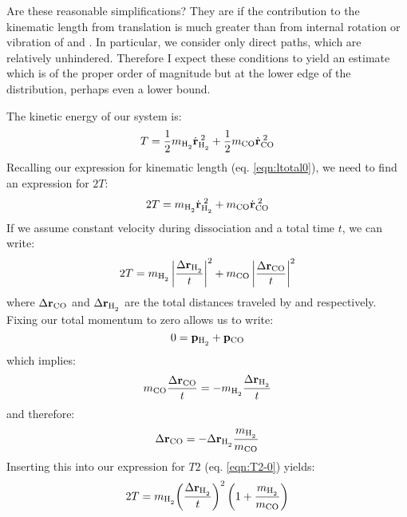 \documentclass[letterpaper,12pt]{article}
\renewcommand{\vec}[1]{\mathbf{#1}}
\renewcommand{\refeq}[1]{eq. \ref{eqn:#1}}
\begin{document}
Are these reasonable simplifications? They are if the contribution to the kinematic length from translation is much greater than from internal rotation or vibration of  and . In particular, we consider only direct paths, which are relatively unhindered. Therefore I expect these conditions to yield an estimate which is of the proper order of magnitude but at the lower edge of the distribution, perhaps even a lower bound. 

The kinetic energy of our system is:
\begin{equation}
T = \frac{1}{2}m\hh \dot{\vec{r}}^{\;2}\hh + \frac{1}{2}m\co \dot{\vec{r}}^{\;2}\co
\end{equation}
Recalling our expression for kinematic length (\refeq{ltotal0}), we need to find an expression for $2T$:
\begin{equation}
2T = m\hh \dot{\vec{r}}^{\;2}\hh + m\co \dot{\vec{r}}^{\;2}\co
\end{equation}
If we assume constant velocity during dissociation and a total time $t$, we can write:
\begin{equation}\label{eqn:T2-0}
2T = m\hh \left|\frac{\Delta \vec{r}\hh}{t} \right|^2 + m\co \left|\frac{\Delta \vec{r}\co}{t} \right|^2
\end{equation}
where $\Delta \vec{r}\co$ and $\Delta \vec{r}\hh$ are the total distances traveled by  and  respectively. Fixing our total momentum to zero allows us to write:
\begin{equation}
0=\vec{p}\hh+\vec{p}\co
\end{equation}
which implies:
\begin{equation}
m\co \frac{\Delta \vec{r}\co}{t} = -m\hh \frac{\Delta \vec{r}\hh}{t}
\end{equation}
and therefore:
\begin{equation}\label{eqn:rcoASrhh}
\Delta \vec{r}\co = -\Delta \vec{r}\hh \frac{m\hh}{m\co}
\end{equation}
Inserting this into our expression for $T2$ (\refeq{T2-0}) yields:
\begin{equation}\label{eqn:T2-1}
2T = m\hh {\left( \frac{\Delta \vec{r}\hh}{t}\right)}^2 \left(1 + \frac{m\hh}{m\co} \right)
\end{equation}
\end{document}
